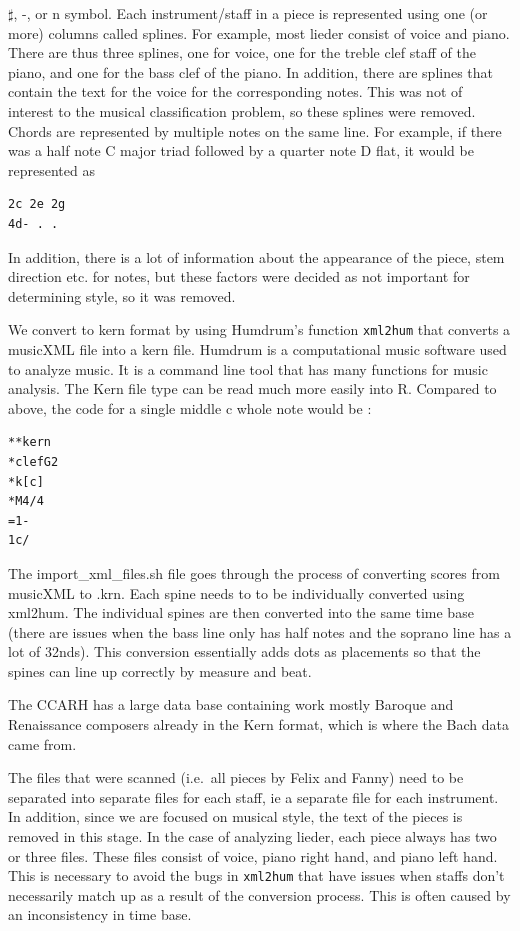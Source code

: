\documentclass[12pt,twoside]{reedthesis}
\theoremstyle{definition}
\theoremstyle{definition}
\theoremstyle{definition}
\theoremstyle{remark}
\begin{document}
\(\sharp\), -, or n symbol. Each instrument/staff in a piece is
represented using one (or more) columns called splines. For example,
most lieder consist of voice and piano. There are thus three splines,
one for voice, one for the treble clef staff of the piano, and one for
the bass clef of the piano. In addition, there are splines that contain
the text for the voice for the corresponding notes. This was not of
interest to the musical classification problem, so these splines were
removed. Chords are represented by multiple notes on the same line. For
example, if there was a half note C major triad followed by a quarter
note D flat, it would be represented as
\begin{verbatim}
2c 2e 2g
4d- . . 
\end{verbatim}
In addition, there is a lot of information about the appearance of the
piece, stem direction etc. for notes, but these factors were decided as
not important for determining style, so it was removed.

We convert to kern format by using Humdrum's function \texttt{xml2hum}
that converts a musicXML file into a kern file. Humdrum is a
computational music software used to analyze music. It is a command line
tool that has many functions for music analysis. The Kern file type can
be read much more easily into R. Compared to above, the code for a
single middle c whole note would be :
\begin{verbatim}
**kern
*clefG2
*k[c]
*M4/4
=1-
1c/
\end{verbatim}
The import\_xml\_files.sh file goes through the process of converting
scores from musicXML to .krn. Each spine needs to to be individually
converted using xml2hum. The individual spines are then converted into
the same time base (there are issues when the bass line only has half
notes and the soprano line has a lot of 32nds). This conversion
essentially adds dots as placements so that the spines can line up
correctly by measure and beat.

The CCARH has a large data base containing work mostly Baroque and
Renaissance composers already in the Kern format, which is where the
Bach data came from.

The files that were scanned (i.e.~all pieces by Felix and Fanny) need to
be separated into separate files for each staff, ie a separate file for
each instrument. In addition, since we are focused on musical style, the
text of the pieces is removed in this stage. In the case of analyzing
lieder, each piece always has two or three files. These files consist of
voice, piano right hand, and piano left hand. This is necessary to avoid
the bugs in \texttt{xml2hum} that have issues when staffs don't
necessarily match up as a result of the conversion process. This is
often caused by an inconsistency in time base.
\end{document}
